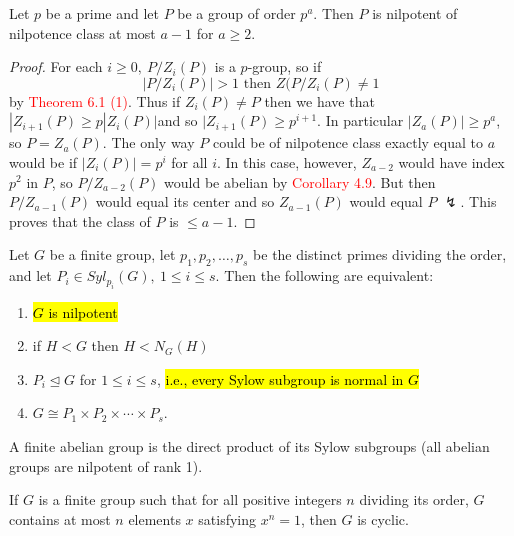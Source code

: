 \nl

\begin{prop}
Let $p$ be a prime and let $P$ be a group of order $p^a$. Then $P$ is nilpotent of nilpotence class at most $a-1$ for $a\geq 2$.
\end{prop}

\begin{proof}
For each $i\geq 0,\ P/Z_i(P)$ is a $p$-group, so if 
\[|P/Z_i(P)| > 1\text{ then } Z(P/Z_i(P)\neq 1\]
by \textcolor{red}{Theorem 6.1 (1)}. Thus if $Z_i(P)\neq P$ then we have that $|Z_{i + 1}(P) \geq p|Z_i(P)|$and so $|Z_{i+1}(P)\geq p^{i+1}$. In particular $|Z_a(P)|\geq p^a$, so $P = Z_a(P)$. The only way $P$ could be of nilpotence class exactly equal to $a$ would be if $|Z_i(P)| = p^i$ for all $i$. In this case, however, $Z_{a-2}$ would have index $p^2$ in $P$, so $P/Z_{a-2}(P)$ would be abelian by \textcolor{red}{Corollary 4.9}. But then $P/Z_{a-1}(P)$ would equal its center and so $Z_{a-1}(P)$ would equal $P$ $\lightning$. This proves that the class of $P$ is $\leq a-1$.
\end{proof}

\nl

\begin{thm}
Let $G$ be a finite group, let $p_1, p_2, \ldots,p_s$ be the distinct primes dividing the order, and let $P_i\in Syl_{p_i}(G),\ 1\leq i\leq s$. Then the following are equivalent:
\begin{enumerate}
\item \hl{$G$ is nilpotent}
\item if $H<G$ then $H<N_G(H)$
\item $P_i\unlhd G$ for $1\leq i\leq s$, \hl{i.e., every Sylow subgroup is normal in $G$}
\item $G\cong P_1\times P_2\times \cdots\times P_s$.
\end{enumerate}
\end{thm}

\nl

\begin{cor}
A finite abelian group is the direct product of its Sylow subgroups (all abelian groups are nilpotent of rank 1).
\end{cor}


\nl

\begin{prop}
If $G$ is a finite group such that for all positive integers $n$ dividing its order, $G$ contains at most $n$ elements $x$ satisfying $x^n = 1$, then $G$ is cyclic.
\end{prop}

